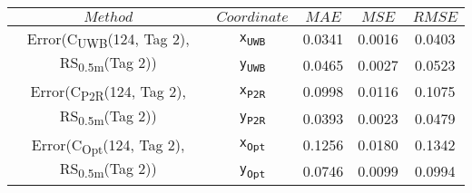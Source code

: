 \begin{table}[h]
\centering
\begin{tabular}{|c|c|c|c|c|}
\hline
$Method$ & $Coordinate$ & $MAE$ & $MSE$ & $RMSE$ \\
\hline
\multirow{2}{*}{{\footnotesize Error(C\textsubscript{UWB}(124, Tag 2), RS\textsubscript{0.5m}(Tag 2))}} & \texttt{x\textsubscript{UWB}} & 0.0341 & 0.0016 & 0.0403 \\
& \texttt{y\textsubscript{UWB}} & 0.0465 & 0.0027 & 0.0523 \\
\hline
\multirow{2}{*}{{\footnotesize Error(C\textsubscript{P2R}(124, Tag 2), RS\textsubscript{0.5m}(Tag 2))}} & \texttt{x\textsubscript{P2R}} & 0.0998 & 0.0116 & 0.1075 \\
& \texttt{y\textsubscript{P2R}} & 0.0393 & 0.0023 & 0.0479 \\
\hline
\multirow{2}{*}{{\footnotesize Error(C\textsubscript{Opt}(124, Tag 2), RS\textsubscript{0.5m}(Tag 2))}} & \texttt{x\textsubscript{Opt}} & 0.1256 & 0.0180 & 0.1342 \\
& \texttt{y\textsubscript{Opt}} & 0.0746 & 0.0099 & 0.0994 \\
\hline
\end{tabular}
\end{table}

